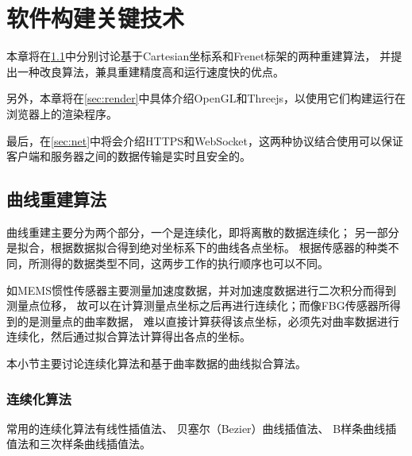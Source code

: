 \clearpage

\section{软件构建关键技术}
\label{sec:skills}

本章将在\ref{sec:reconst}中分别讨论基于Cartesian坐标系和Frenet标架的两种重建算法，
并提出一种改良算法，兼具重建精度高和运行速度快的优点。

另外，本章将在\ref{sec:render}中具体介绍OpenGL和Threejs，以使用它们构建运行在浏览器上的渲染程序。

最后，在\ref{sec:net}中将会介绍HTTPS和WebSocket，这两种协议结合使用可以保证客户端和服务器之间的数据传输是实时且安全的。

\subsection{曲线重建算法}
\label{sec:reconst}
曲线重建主要分为两个部分，一个是连续化，即将离散的数据连续化；
另一部分是拟合，根据数据拟合得到绝对坐标系下的曲线各点坐标。
根据传感器的种类不同，所测得的数据类型不同，这两步工作的执行顺序也可以不同。

如MEMS惯性传感器主要测量加速度数据，并对加速度数据进行二次积分而得到测量点位移，
故可以在计算测量点坐标之后再进行连续化；而像FBG传感器所得到的是测量点的曲率数据，
难以直接计算获得该点坐标，必须先对曲率数据进行连续化，然后通过拟合算法计算得出各点的坐标。

本小节主要讨论连续化算法和基于曲率数据的曲线拟合算法。

\subsubsection{连续化算法}
常用的连续化算法有线性插值法、
贝塞尔（Bezier）曲线插值法、
B样条曲线插值法和三次样条曲线插值法。


